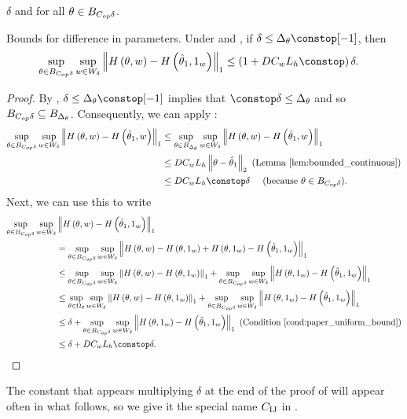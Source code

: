 $\delta$ and for all $\theta\in B_{C_{op}\delta}$.
%
\begin{lem}
\label{lem:gh_difference_from_one}Bounds for difference in parameters.
Under \paperallcoreassum and , if $\delta\le\thetasize\constop[-1]$,
then
\begin{align*}
\sup_{\theta\in\thetadeltaball}\sup_{w\in W_{\delta}} & \norm{H\left(\theta,w\right)-H\left(\thetaone,\onevec\right)}_{1}\le\left(1+D\constw\liph\constop\right)\delta.
\end{align*}
\end{lem}
\begin{proof}
By , $\delta\le\thetasize\constop[-1]$
implies that $\constop\delta\le\thetasize$ and so $B_{C_{op}\delta}\subseteq B_{\Delta_{\theta}}$.
Consequently, we can apply :
\begin{align*}
\sup_{\theta\in\thetadeltaball}\sup_{w\in W_{\delta}}\norm{H\left(\theta,w\right)-H\left(\thetaone,w\right)}_{1} & \le\sup_{\theta\in\thetaball}\sup_{w\in W_{\delta}}\norm{H\left(\theta,w\right)-H\left(\thetaone,w\right)}_{1}\\
 & \le D\constw\liph\norm{\theta-\thetaone}_{2}\textrm{ (Lemma \ref{lem:bounded_continuous})}\\
 & \le D\constw\liph\constop\delta\quad\textrm{ (because }\theta\in\thetadeltaball\textrm{)}.
\end{align*}
%
Next, we can use this to write
\begin{align*}
\sup_{\theta\in\thetadeltaball}\sup_{w\in W_{\delta}} & \norm{H\left(\theta,w\right)-H\left(\thetaone,\onevec\right)}_{1}\\
 & =\sup_{\theta\in\thetadeltaball}\sup_{w\in W_{\delta}}\norm{H\left(\theta,w\right)-H\left(\theta,\onevec\right)+H\left(\theta,\onevec\right)-H\left(\thetaone,\onevec\right)}_{1}\\
 & \le\sup_{\theta\in\thetadeltaball}\sup_{w\in W_{\delta}}\norm{H\left(\theta,w\right)-H\left(\theta,\onevec\right)}_{1}+\sup_{\theta\in\thetadeltaball}\sup_{w\in W_{\delta}}\norm{H\left(\theta,\onevec\right)-H\left(\thetaone,\onevec\right)}_{1}\\
 & \le\sup_{\theta\in\Omega_{\theta}}\sup_{w\in W_{\delta}}\norm{H\left(\theta,w\right)-H\left(\theta,\onevec\right)}_{1}+\sup_{\theta\in\thetadeltaball}\sup_{w\in W_{\delta}}\norm{H\left(\theta,\onevec\right)-H\left(\thetaone,\onevec\right)}_{1}\\
 & \le\delta+\sup_{\theta\in\thetadeltaball}\sup_{w\in W_{\delta}}\norm{H\left(\theta,\onevec\right)-H\left(\thetaone,\onevec\right)}_{1}\textrm{ (Condition \ref{cond:paper_uniform_bound})}\\
 & \le\delta+D\constw\liph\constop\delta.
\end{align*}
\end{proof}
%
The constant that appears multiplying $\delta$ at the end of the proof of
 will appear often in what follows, so we give it
the special name $C_{\textrm{IJ}}$ in .

